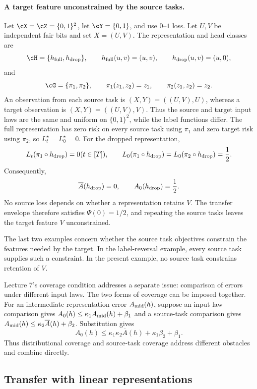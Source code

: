 \documentclass[11pt,twoside]{article}
\theoremstyle{definition}
\theoremstyle{remark}
\begin{document}
\paragraph{A target feature unconstrained by the source tasks.}
Let $\cX=\cZ=\{0,1\}^2$, let $\cY=\{0,1\}$, and use $0$--$1$ loss.
Let $U,V$ be independent fair bits and set $X=(U,V)$. The representation
and head classes are
\[
 \cH=\{h_{\rm full},h_{\rm drop}\},
 \qquad
 h_{\rm full}(u,v)=(u,v),
 \qquad
 h_{\rm drop}(u,v)=(u,0),
\]
and
\[
 \cG=\{\pi_1,\pi_2\},
 \qquad
 \pi_1(z_1,z_2)=z_1,
 \qquad
 \pi_2(z_1,z_2)=z_2.
\]
An observation from each source task is
$(X,Y)=((U,V),U)$, whereas a target observation is
$(X,Y)=((U,V),V)$. Thus the source and target input laws are the same and
uniform on $\{0,1\}^2$, while the label functions differ. The full
representation has zero risk on every source task using $\pi_1$ and zero
target risk using $\pi_2$, so $L_t^\star=L_0^\star=0$. For the dropped
representation,
\[
 L_t(\pi_1\circ h_{\rm drop})=0
 \quad(t\in[T]),
 \qquad
 L_0(\pi_1\circ h_{\rm drop})
 =L_0(\pi_2\circ h_{\rm drop})=\frac12.
\]
Consequently,
\[
 \overline A(h_{\rm drop})=0,
 \qquad
 A_0(h_{\rm drop})=\frac12.
\]
No source loss depends on whether a representation retains $V$. The transfer
envelope therefore satisfies $\Psi(0)=1/2$, and repeating the source tasks
leaves the target feature $V$ unconstrained.

The last two examples concern whether the source task objectives constrain the
features needed by the target. In the label-reversal example, every source
task supplies such a constraint. In the present example, no source task
constrains retention of $V$.

Lecture 7's coverage condition addresses a separate issue: comparison of
errors under different input laws. The two forms of coverage can be imposed
together. For an intermediate representation error $A_{\rm mid}(h)$, suppose
an input-law comparison gives
$A_0(h)\le\kappa_1 A_{\rm mid}(h)+\beta_1$ and a source-task comparison gives
$A_{\rm mid}(h)\le\kappa_2\overline A(h)+\beta_2$. Substitution gives
\[
 A_0(h)
 \le\kappa_1\kappa_2\overline A(h)
   +\kappa_1\beta_2+\beta_1.
\]
Thus distributional coverage and source-task coverage address different
obstacles and combine directly.

\subsection{Transfer with linear representations}
\label{sec:linear-computation}
\end{document}
